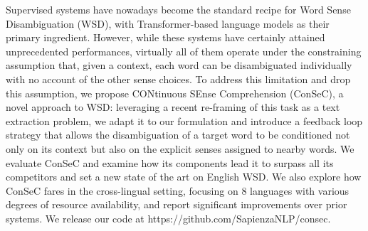 Supervised systems have nowadays become the standard recipe for Word Sense Disambiguation (WSD), with Transformer-based language models as their primary ingredient. However, while these systems have certainly attained unprecedented performances, virtually all of them operate under the constraining assumption that, given a context, each word can be disambiguated individually with no account of the other sense choices. To address this limitation and drop this assumption, we propose CONtinuous SEnse Comprehension (ConSeC), a novel approach to WSD: leveraging a recent re-framing of this task as a text extraction problem, we adapt it to our formulation and introduce a feedback loop strategy that allows the disambiguation of a target word to be conditioned not only on its context but also on the explicit senses assigned to nearby words. We evaluate ConSeC and examine how its components lead it to surpass all its competitors and set a new state of the art on English WSD. We also explore how ConSeC fares in the cross-lingual setting, focusing on 8 languages with various degrees of resource availability, and report significant improvements over prior systems. We release our code at https://github.com/SapienzaNLP/consec.
